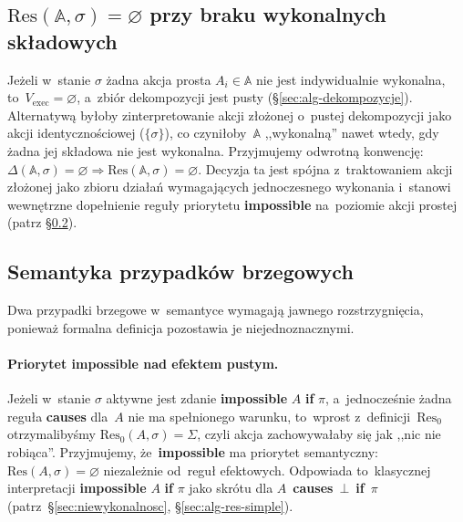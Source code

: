 \documentclass[11pt,a4paper]{article}
\newcommand{\causes}{\textbf{causes}}
\renewcommand{\iff}{\textbf{if}}
\newcommand{\impossible}{\textbf{impossible}}
\theoremstyle{definition}
\begin{document}
\subsection{\texorpdfstring{$\mathrm{Res}(\mathbb{A},\sigma)=\varnothing$}{Res(A,sigma)=empty} przy braku wykonalnych składowych}
\label{sec:decyzja-pusta-dekompozycja}

Jeżeli w~stanie $\sigma$ żadna akcja prosta $A_i \in \mathbb{A}$ nie jest indywidualnie wykonalna, to~$V_{\mathrm{exec}}=\varnothing$, a~zbiór dekompozycji jest pusty (\S\ref{sec:alg-dekompozycje}). Alternatywą byłoby zinterpretowanie akcji złożonej o~pustej dekompozycji jako akcji identycznościowej ($\{\sigma\}$), co czyniłoby~$\mathbb{A}$ ,,wykonalną'' nawet wtedy, gdy żadna jej składowa nie jest wykonalna. Przyjmujemy odwrotną konwencję: $\Delta(\mathbb{A},\sigma)=\varnothing \Rightarrow \mathrm{Res}(\mathbb{A},\sigma)=\varnothing$. Decyzja ta jest spójna z~traktowaniem akcji złożonej jako zbioru działań wymagających jednoczesnego wykonania i~stanowi wewnętrzne dopełnienie reguły priorytetu \impossible{} na~poziomie akcji prostej (patrz §\ref{sec:decyzje-brzegowe}).

\subsection{Semantyka przypadków brzegowych}
\label{sec:decyzje-brzegowe}

Dwa przypadki brzegowe w~semantyce wymagają jawnego rozstrzygnięcia, ponieważ formalna definicja pozostawia je niejednoznacznymi.

\paragraph{Priorytet \impossible{} nad efektem pustym.}
Jeżeli w~stanie $\sigma$ aktywne jest zdanie \impossible{} $A$ \iff{} $\pi$, a~jednocześnie żadna reguła \causes{} dla~$A$ nie ma spełnionego warunku, to~wprost z~definicji~$\mathrm{Res}_0$ otrzymalibyśmy $\mathrm{Res}_0(A,\sigma)=\Sigma$, czyli akcja zachowywałaby się jak ,,nic nie robiąca''. Przyjmujemy, że~\impossible{} ma priorytet semantyczny: $\mathrm{Res}(A,\sigma)=\varnothing$ niezależnie od~reguł efektowych. Odpowiada to~klasycznej interpretacji \impossible{} $A$ \iff{} $\pi$ jako skrótu dla \mbox{$A$ \causes{} $\bot$ \iff{} $\pi$} (patrz~§\ref{sec:niewykonalnosc}, §\ref{sec:alg-res-simple}).
\end{document}
